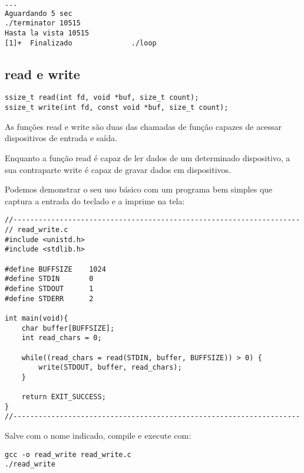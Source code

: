 \begin{espacosimples}
\begin{verbatim}
...
Aguardando 5 sec
./terminator 10515
Hasta la vista 10515
[1]+  Finalizado              ./loop
\end{verbatim}
\end{espacosimples}

\subsection{read e write}

\begin{espacosimples}
\begin{verbatim}
ssize_t read(int fd, void *buf, size_t count);
ssize_t write(int fd, const void *buf, size_t count);
\end{verbatim}
\end{espacosimples}

As funções read e write são duas das chamadas de função capazes de acessar dispositivos de entrada e saída.

Enquanto a função read é capaz de ler dados de um determinado dispositivo, a sua contraparte write é capaz de gravar dados em dispositivos.

Podemos demonstrar o seu uso básico com um programa bem simples que captura a entrada do teclado e a imprime na tela:

\begin{espacosimples}
\begin{verbatim}
//--------------------------------------------------------------------
// read_write.c
#include <unistd.h>
#include <stdlib.h>

#define BUFFSIZE    1024
#define STDIN       0
#define STDOUT      1
#define STDERR      2

int main(void){
    char buffer[BUFFSIZE];
    int read_chars = 0;

    while((read_chars = read(STDIN, buffer, BUFFSIZE)) > 0) {
        write(STDOUT, buffer, read_chars);
    }
    
    return EXIT_SUCCESS;
}
//--------------------------------------------------------------------
\end{verbatim}
\end{espacosimples}

Salve com o nome indicado, compile e execute com:

\begin{espacosimples}
\begin{verbatim}
gcc -o read_write read_write.c
./read_write
\end{verbatim}
\end{espacosimples}


